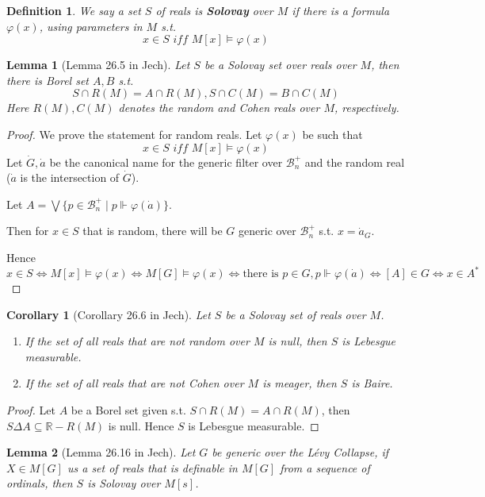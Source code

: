 \documentclass{article}
\newtheorem{definition}{Definition}
\newtheorem{lemma}{Lemma}
\newtheorem{corollary}{Corollary}
\begin{document}
\begin{definition}
    We say a set $S$ of reals is \textbf{Solovay} over $M$ if there is a formula $\varphi(x)$, using parameters in $M$ s.t. $$x\in S\textit{ iff }M[x]\models \varphi(x)$$
\end{definition}

\begin{lemma}[Lemma 26.5 in Jech]\label{lem:Cohen/meagre}
    Let $S$ be a Solovay set over reals over $M$, then there is Borel set $A,B$ s.t. $$S\cap R(M) = A\cap R(M), S\cap C(M) = B\cap C(M)$$
    Here $R(M),C(M)$ denotes the random and Cohen reals over $M$, respectively.
\end{lemma}

\begin{proof}
    We prove the statement for random reals. 
    Let $\varphi(x)$ be such that $$x\in S\textit{ iff }M[x]\models \varphi(x)$$
    Let $\dot{G},\dot{a}$ be the canonical name for the generic filter over $\mathcal{B}_n^+$ and the random real ($\dot{a}$ is the intersection of $\dot{G}$).

    Let $A = \bigvee\{p\in \mathcal{B}_n^+\mid p\Vdash \varphi(\dot{a})\}$.

    Then for $x\in S$ that is random, there will be $G$ generic over $\mathcal{B}_n^+$ s.t. $x = \dot{a}_G$.

    Hence $$x\in S\iff M[x]\models \varphi(x) \iff M[G]\models \varphi(x)\iff  \text{there is }p\in G, p\Vdash \varphi(\dot{a})\iff [A]\in G\iff x\in A^*$$
\end{proof}

\begin{corollary}[Corollary 26.6 in Jech]\label{cor:Baire-Lebesgue} Let $S$ be a Solovay set of reals over $M$.
    \begin{enumerate}
        \item If the set of all reals that are not random over $M$ is null, then $S$ is Lebesgue measurable.
        \item If the set of all reals that are not Cohen over $M$ is meager, then $S$ is Baire.
    \end{enumerate}
\end{corollary}

\begin{proof}
    Let $A$ be a Borel set given s.t. $S\cap R(M) = A\cap R(M)$, then $S\Delta A\subseteq \mathbb{R} - R(M)$ is null. Hence $S$ is Lebesgue measurable.
\end{proof}

\begin{lemma}[Lemma 26.16 in Jech]\label{lem:Solovay-set}
    Let $G$ be generic over the L\'evy Collapse, if $X\in M[G]$ us a set of reals that is definable in $M[G]$ from a sequence of ordinals, then $S$ is Solovay over $M[s]$.
\end{lemma}
\end{document}
